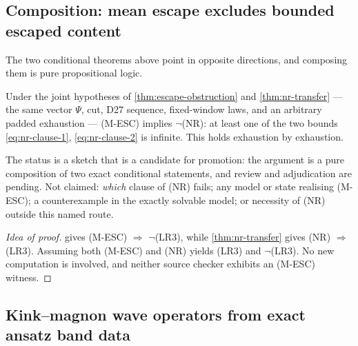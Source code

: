\subsection{Composition: mean escape excludes bounded escaped content}
\label{subsec:m-esc-nr}

The two conditional theorems above point in opposite directions, and composing
them is pure propositional logic.

\begin{proposition}
\label{thm:m-esc-nr}
\statusSketch\;
Under the joint hypotheses of \cref{thm:escape-obstruction} and
\cref{thm:nr-transfer} --- the same vector $\Psi$, cut, D27 sequence,
fixed-window laws, and an arbitrary padded exhaustion --- (M-ESC) implies
$\neg$(NR): at least one of the two bounds \eqref{eq:nr-clause-1},
\eqref{eq:nr-clause-2} is infinite. This holds exhaustion by exhaustion.
\end{proposition}

\begin{scope}
\label{scope:m-esc-nr}
The status is a sketch that is a candidate for promotion: the argument is a
pure composition of two exact conditional statements, and review and
adjudication are pending. Not claimed: \emph{which} clause of (NR) fails; any
model or state realising (M-ESC); a counterexample in the exactly solvable
model; or necessity of (NR) outside this named route.
\end{scope}

\begin{proof}[Idea of proof]
 gives (M-ESC) $\Rightarrow$ $\neg$(LR3), while
\cref{thm:nr-transfer} gives (NR) $\Rightarrow$ (LR3). Assuming both (M-ESC)
and (NR) yields (LR3) and $\neg$(LR3). No new computation is involved, and
neither source checker exhibits an (M-ESC) witness.
\end{proof}


\subsection{Kink--magnon wave operators from exact ansatz band data}
\label{subsec:wave-operators}

